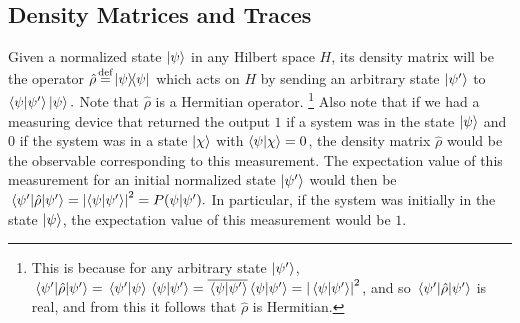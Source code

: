 \documentclass[letter, 12pt]{turabian-thesis}
\theoremstyle{hypothesis}
\newcommand\myeq{\stackrel{\mathclap{\scriptsize\mbox{def}}}{=}}
\let\origfootnote\footnote %
\renewcommand{\footnote}[1]{%
\noindent %
\origfootnote{#1}}
\begin{document}
\subsection{Density Matrices and Traces}
Given a normalized state $\ket{\psi}$ in any Hilbert space $H$,  its density matrix will be the operator $\hat{\rho}\myeq\dyad{\psi}$ which acts on $H$ by sending an arbitrary state $\ket{\psi'}$ to $\ip{\psi}{\psi'}\ket{\psi}.$  Note that $\hat{\rho}$ is a Hermitian operator.\footnote{This is because for any arbitrary state $\ket{\psi'}$, $\ev*{\hat{\rho}}{{\psi'}} = \ip*{\psi'}{\psi} \ip*{\psi}{\psi'}=\overline{\ip*{\psi}{\psi'}}\ip*{\psi}{\psi'}=\abs{\ip*{\psi}{\psi'}}^2$, and so $\ev*{\hat{\rho}}{{\psi'}}$ is real, and from this it follows that $\hat{\rho}$ is Hermitian. } Also note that if we had a measuring device that returned the output $1$ if a system was in the state $\ket{\psi}$ and $0$ if the system was in a state $\ket{\chi}$ with $\ip{\psi}{\chi}=0$, the density matrix $\hat{\rho}$ would be the observable corresponding to this measurement. The expectation value of this measurement for an initial normalized state $\ket{\psi'}$ would then be $\ev*{\hat{\rho}}{\psi'}=\abs{\ip{\psi}{\psi'}}^2=P(\psi|\psi').$ In particular, if the system was initially in the state $\ket{\psi}$, the expectation value of this measurement would be $1$.
\end{document}

